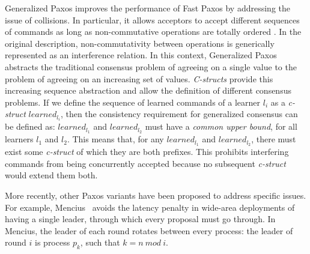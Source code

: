 Generalized Paxos improves the performance of Fast Paxos by addressing the issue of collisions. In particular, it allows acceptors to accept different sequences of commands as long as non-commutative operations are totally ordered \cite{Lamport2005}. In the original description, non-commutativity between operations is generically represented as an interference relation. In this context, Generalized Paxos abstracts the traditional consensus problem of agreeing on a single value to the problem of agreeing on an increasing set of values. \textit{C-structs} provide this increasing sequence abstraction and allow the definition of different consensus problems. If we define the sequence of learned commands of a learner $l_i$ as a \textit{c-struct} $learned_{l_i}$, then the consistency requirement for generalized consensus can be defined as: $learned_{l_1}$ and $learned_{l_2}$ must have a \textit{common upper bound}, for all learners $l_1$ and $l_2$. This means that, for any $learned_{l_1}$ and $learned_{l_2}$, there must exist some \textit{c-struct} of which they are both prefixes. This prohibits interfering commands from being concurrently accepted because no subsequent \textit{c-struct} would extend them both. \par
More recently, other Paxos variants have been proposed to address specific issues. For example, Mencius~\cite{Mao2008} avoids the latency penalty in wide-area deployments of having a single leader, through which every proposal must go through. In Mencius, the leader of each round rotates between every process: the leader of round $i$ is process $p_k$, such that $k = n\ mod\ i$.  
